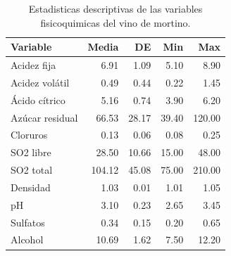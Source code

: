 \begin{table}[ht]
\centering
\begin{tabular}{lrrrr}
  \toprule
Variable & Media & DE & Min & Max \\ 
  \midrule
Acidez fija & 6.91 & 1.09 & 5.10 & 8.90 \\ 
  Acidez volátil & 0.49 & 0.44 & 0.22 & 1.45 \\ 
  Ácido cítrico & 5.16 & 0.74 & 3.90 & 6.20 \\ 
  Azúcar residual & 66.53 & 28.17 & 39.40 & 120.00 \\ 
  Cloruros & 0.13 & 0.06 & 0.08 & 0.25 \\ 
  SO2 libre & 28.50 & 10.66 & 15.00 & 48.00 \\ 
  SO2 total & 104.12 & 45.08 & 75.00 & 210.00 \\ 
  Densidad & 1.03 & 0.01 & 1.01 & 1.05 \\ 
  pH & 3.10 & 0.23 & 2.65 & 3.45 \\ 
  Sulfatos & 0.34 & 0.15 & 0.20 & 0.65 \\ 
  Alcohol & 10.69 & 1.62 & 7.50 & 12.20 \\ 
   \bottomrule
\end{tabular}
\caption{Estadisticas descriptivas de las variables fisicoquimicas del vino de mortino.} 
\label{tab:estadisticas}
\end{table}
